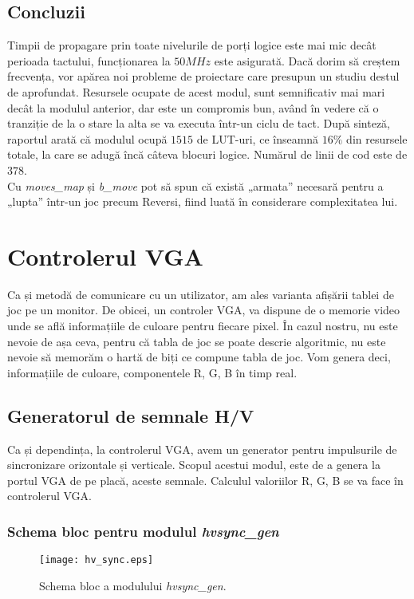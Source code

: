 \documentclass[12pt,twoside,a4paper,fleqn]{book}
\theoremstyle{definition}
\begin{document}
\subsection{Concluzii}
Timpii de propagare prin toate nivelurile de porți logice este mai mic decât perioada tactului, funcționarea la $50MHz$ este asigurată. Dacă dorim să creștem frecvența, vor apărea noi probleme de proiectare care presupun un studiu destul de aprofundat. Resursele ocupate de acest modul, sunt semnificativ mai mari decât la modulul anterior, dar este un compromis bun, având în vedere că o tranziție de la o stare la alta se va executa într-un ciclu de tact. 
După sinteză, raportul arată că modulul ocupă $1515$ de LUT-uri, ce înseamnă $16\%$ din resursele totale, la care se adugă încă câteva blocuri logice. Numărul de linii de cod este de $378$.
\\Cu \emph{moves\_map} și \emph{b\_move} pot să spun că există „armata” necesară pentru a „lupta” într-un joc precum Reversi, fiind luată în considerare complexitatea lui.

\section{Controlerul VGA}
\label{vga_ctrl}
Ca și metodă de comunicare cu un utilizator, am ales varianta afișării tablei de joc pe un monitor. De obicei, un controler VGA, va dispune de o memorie video unde se află informațiile de culoare pentru fiecare pixel. În cazul nostru, nu este nevoie de așa ceva, pentru că tabla de joc se poate descrie algoritmic, nu este nevoie să memorăm o hartă de biți ce compune tabla de joc. Vom genera deci, informațiile de culoare, componentele R, G, B în timp real.
\subsection{Generatorul de semnale H/V}
Ca și dependința, la controlerul VGA, avem un generator pentru impulsurile de sincronizare orizontale și verticale. Scopul acestui modul, este de a genera la portul VGA de pe placă, aceste semnale. Calculul valoriilor R, G, B se va face în controlerul VGA.


\subsubsection{Schema bloc pentru modulul \emph{hvsync\_gen}}
\begin{figure}[h]
\texttt{[image: hv\_sync.eps]}
\caption{\small{Schema bloc a modulului \emph{hvsync\_gen}.}}
\label{fig:fig_hvsync}
\end{figure}
\end{document}
